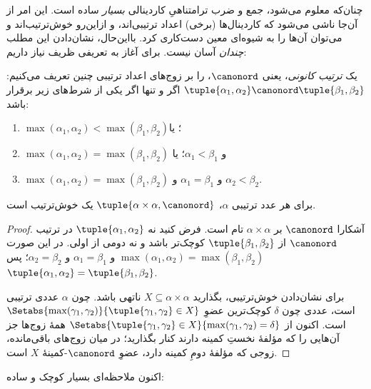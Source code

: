 \documentclass[../../../include/open-logic-section]{subfiles}
\begin{document}


چنان‌که معلوم می‌شود، جمع و ضرب ترامتناهیِ کاردینالی
\emph{بسیار} ساده است. این امر از آن‌جا ناشی می‌شود که کاردینال‌ها
(برخی) اعداد ترتیبی‌اند، و ازاین‌رو خوش‌ترتیب‌اند و می‌توان آن‌ها را
به شیوه‌ای معین دست‌کاری کرد. بااین‌حال، نشان‌دادن این مطلب
\emph{چندان} آسان نیست. برای آغاز به تعریفی ظریف نیاز داریم:

\begin{defn}
یک \emph{ترتیب کانونی}، یعنی $\canonord$، را بر زوج‌های اعداد ترتیبی
چنین تعریف می‌کنیم: $\tuple{\alpha_1, \alpha_2} \canonord
\tuple{\beta_1, \beta_2}$ اگر و تنها اگر یکی از شرط‌های زیر برقرار باشد:
\begin{enumerate}
	\item $\max(\alpha_1, \alpha_2) < \max(\beta_1, \beta_2)$؛ یا
	\item $\max(\alpha_1, \alpha_2) = \max(\beta_1, \beta_2)$ و
	$\alpha_1 < \beta_1$؛ یا
	\item $\max(\alpha_1, \alpha_2) = \max(\beta_1, \beta_2)$ و
	$\alpha_1 = \beta_1$ و $\alpha_2 < \beta_2$.
\end{enumerate}
\end{defn}

\begin{lem}
برای هر عدد ترتیبی $\alpha$، $\tuple{\alpha \times \alpha, \canonord}$
یک خوش‌ترتیب است.
\end{lem}

\begin{proof}
آشکارا $\canonord$ بر $\alpha \times \alpha$ تام است. فرض کنید نه
$\tuple{\alpha_1, \alpha_2}$ در ترتیب $\canonord$ از
$\tuple{\beta_1, \beta_2}$ کوچک‌تر باشد و نه دومی از اولی. در این صورت
$\max(\alpha_1, \alpha_2) = \max(\beta_1, \beta_2)$ و
$\alpha_1 = \beta_1$ و $\alpha_2 = \beta_2$؛ پس
$\tuple{\alpha_1, \alpha_2} = \tuple{\beta_1, \beta_2}$.

برای نشان‌دادن خوش‌ترتیبی، بگذارید $X \subseteq \alpha\times\alpha$
ناتهی باشد. چون $\alpha$ عددی ترتیبی است، عددی چون $\delta$ کوچک‌ترین
عضوِ $\Setabs{\max(\gamma_1, \gamma_2)}{\tuple{\gamma_1,
\gamma_2} \in X}$ است. اکنون از
$\Setabs{\tuple{\gamma_1,\gamma_2} \in X}{\max(\gamma_1, \gamma_2) =
\delta}$ همهٔ زوج‌ها جز آن‌هایی را که مؤلفهٔ نخستِ کمینه دارند کنار
بگذارید؛ در میان زوج‌های باقی‌مانده، زوجی که مؤلفهٔ دومِ کمینه دارد،
عضوِ $\canonord$-کمینهٔ $X$ است.
\end{proof}
\noindent
اکنون ملاحظه‌ای بسیار کوچک و ساده:
\end{document}
